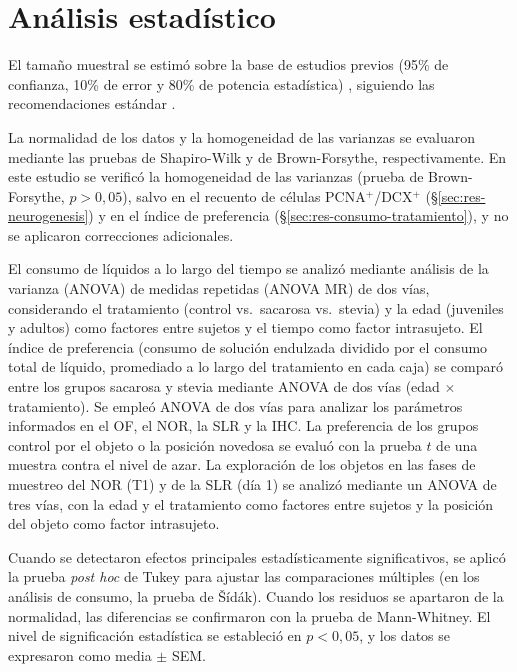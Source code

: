 \FloatBarrier
\section{Análisis estadístico}\label{sec:estadistico}

El tamaño muestral se estimó sobre la base de estudios previos (95\% de confianza, 10\% de error y 80\% de potencia estadística) \cite{coirini2022sucrose,rey2024metformin,kruse2019sucrose,kruse2025stevia}, siguiendo las recomendaciones estándar \cite{charan2013sample}.

La normalidad de los datos y la homogeneidad de las varianzas se evaluaron mediante las pruebas de Shapiro-Wilk y de Brown-Forsythe, respectivamente. En este estudio se verificó la homogeneidad de las varianzas (prueba de Brown-Forsythe, $p > 0{,}05$), salvo en el recuento de células PCNA$^{+}$/DCX$^{+}$ (\S\ref{sec:res-neurogenesis}) y en el índice de preferencia (\S\ref{sec:res-consumo-tratamiento}), y no se aplicaron correcciones adicionales.

El consumo de líquidos a lo largo del tiempo se analizó mediante análisis de la varianza (ANOVA) de medidas repetidas (ANOVA MR) de dos vías, considerando el tratamiento (control vs.\ sacarosa vs.\ stevia) y la edad (juveniles y adultos) como factores entre sujetos y el tiempo como factor intrasujeto. El índice de preferencia (consumo de solución endulzada dividido por el consumo total de líquido, promediado a lo largo del tratamiento en cada caja) se comparó entre los grupos sacarosa y stevia mediante ANOVA de dos vías (edad $\times$ tratamiento). Se empleó ANOVA de dos vías para analizar los parámetros informados en el OF, el NOR, la SLR y la IHC. La preferencia de los grupos control por el objeto o la posición novedosa se evaluó con la prueba $t$ de una muestra contra el nivel de azar. La exploración de los objetos en las fases de muestreo del NOR (T1) y de la SLR (día 1) se analizó mediante un ANOVA de tres vías, con la edad y el tratamiento como factores entre sujetos y la posición del objeto como factor intrasujeto.

Cuando se detectaron efectos principales estadísticamente significativos, se aplicó la prueba \textit{post hoc} de Tukey para ajustar las comparaciones múltiples (en los análisis de consumo, la prueba de Šídák). Cuando los residuos se apartaron de la normalidad, las diferencias se confirmaron con la prueba de Mann-Whitney. El nivel de significación estadística se estableció en $p < 0{,}05$, y los datos se expresaron como media $\pm$ SEM.

